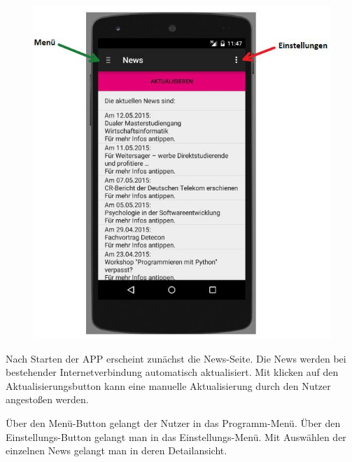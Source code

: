 \begin{figure}[h]
	\centering
	\includegraphics[scale=0.8]{03_Bedienungsanleitung/img/start2.jpg}
	\label{img:grafik-dummy}
\end{figure}


Nach Starten der APP erscheint zunächst die News-Seite. Die News werden bei bestehender Internetverbindung automatisch aktualisiert. Mit klicken auf den Aktualisierungsbutton kann eine manuelle Aktualisierung durch den Nutzer angestoßen werden.

Über den Menü-Button gelangt der Nutzer in das Programm-Menü. Über den Einstellungs-Button gelangt man in das Einstellungs-Menü.
Mit Auswählen der einzelnen News gelangt man in deren Detailansicht.

\newpage
